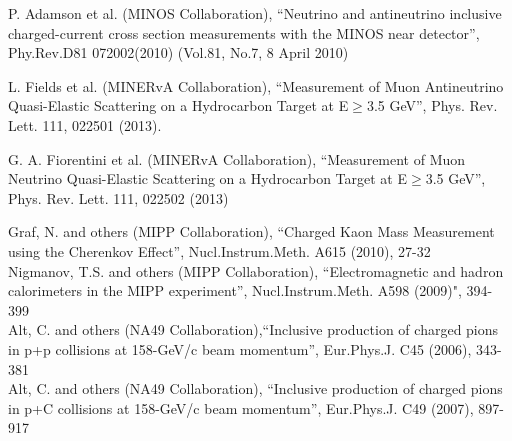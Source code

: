 \documentclass[%
aps, prd, reprint, show pacs, preprint numbers, ams math, amssymb, superscriptaddress, linenumbers]{revtex4-1}
\begin{document}
\begin{thebibliography}{99}

  P. Adamson et al. (MINOS Collaboration), ``Neutrino and antineutrino inclusive charged-current cross section measurements with the MINOS near detector'', Phy.Rev.D81 072002(2010) (Vol.81, No.7, 8 April 2010)

    L. Fields et al. (MINERvA Collaboration), ``Measurement of Muon Antineutrino Quasi-Elastic Scattering on a Hydrocarbon Target at E$\ge$3.5 GeV'', Phys. Rev. Lett. 111, 022501 (2013). 

    G. A. Fiorentini et al. (MINERvA Collaboration), ``Measurement of Muon Neutrino Quasi-Elastic Scattering on a Hydrocarbon Target at E$\ge$3.5 GeV'', Phys. Rev. Lett. 111, 022502 (2013)

	Graf, N. and others (MIPP Collaboration), ``Charged Kaon Mass Measurement using the Cherenkov Effect'', Nucl.Instrum.Meth. A615 (2010), 27-32\\

	Nigmanov, T.S. and others (MIPP Collaboration), ``Electromagnetic and hadron calorimeters in the MIPP experiment'', Nucl.Instrum.Meth. A598 (2009)", 394-399\\
	
	Alt, C. and others (NA49 Collaboration),``Inclusive production of charged pions in p+p collisions at 158-GeV/c beam momentum'', Eur.Phys.J. C45 (2006), 343-381\\
	
      Alt, C. and others (NA49 Collaboration), ``Inclusive production of charged pions in p+C collisions at 158-GeV/c beam momentum'', Eur.Phys.J. C49 (2007), 897-917\\

\end{thebibliography}
\end{document}
